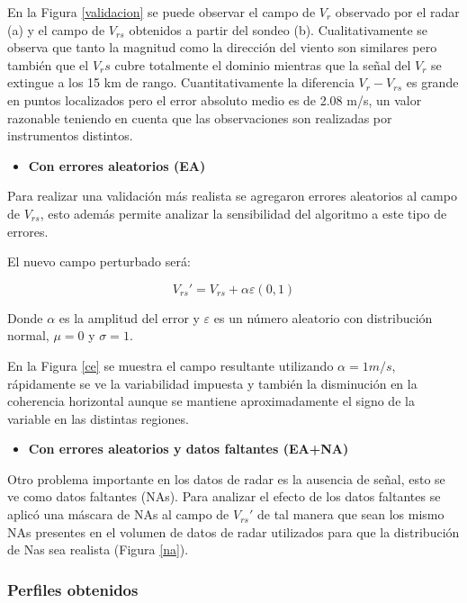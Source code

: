 \documentclass[12pt,spanish,oneside]{book}
\providecommand{\tightlist}{%
  \setlength{\itemsep}{0pt}\setlength{\parskip}{0pt}}
\begin{document}
En la Figura \ref{validacion} se puede observar el campo de \(V_r\)
observado por el radar (a) y el campo de \(V_{rs}\) obtenidos a partir
del sondeo (b). Cualitativamente se observa que tanto la magnitud como
la dirección del viento son similares pero también que el \(V_rs\) cubre
totalmente el dominio mientras que la señal del \(V_r\) se extingue a
los 15 km de rango. Cuantitativamente la diferencia \(V_r - V_{rs}\) es
grande en puntos localizados pero el error absoluto medio es de 2.08
m/s, un valor razonable teniendo en cuenta que las observaciones son
realizadas por instrumentos distintos.

\begin{itemize}
\tightlist
\item
  \textbf{Con errores aleatorios (EA)}
\end{itemize}

Para realizar una validación más realista se agregaron errores
aleatorios al campo de \(V_{rs}\), esto además permite analizar la
sensibilidad del algoritmo a este tipo de errores.

El nuevo campo perturbado será:

\begin{equation} \label{eq-vr12}
V_{rs}'  = V_{rs} + \alpha \varepsilon(0,1)
\end{equation}

Donde \(\alpha\) es la amplitud del error y \(\varepsilon\) es un número
aleatorio con distribución normal, \(\mu = 0\) y \(\sigma= 1\).

En la Figura \ref{ce} se muestra el campo resultante utilizando
\(\alpha = 1 m/s\), rápidamente se ve la variabilidad impuesta y también
la disminución en la coherencia horizontal aunque se mantiene
aproximadamente el signo de la variable en las distintas regiones.

\begin{itemize}
\tightlist
\item
  \textbf{Con errores aleatorios y datos faltantes (EA+NA)}
\end{itemize}

Otro problema importante en los datos de radar es la ausencia de señal,
esto se ve como datos faltantes (NAs). Para analizar el efecto de los
datos faltantes se aplicó una máscara de NAs al campo de \(V_{rs}'\) de
tal manera que sean los mismo NAs presentes en el volumen de datos de
radar utilizados para que la distribución de Nas sea realista (Figura
\ref{na}).

\subsubsection{Perfiles obtenidos}\label{perfiles-obtenidos}
\end{document}
